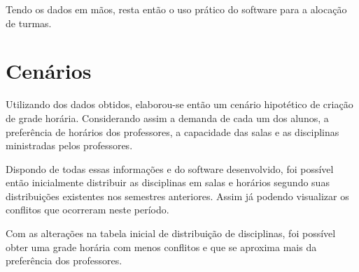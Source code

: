     Tendo os dados em mãos, resta então o uso prático do software para a alocação de turmas.

\section{Cenários} %

    Utilizando dos dados obtidos, elaborou-se então um cenário hipotético de criação de grade horária. Considerando assim a demanda de cada um dos alunos, a preferência de horários dos professores, a capacidade das salas e as disciplinas ministradas pelos professores.

    Dispondo de todas essas informações e do software desenvolvido, foi possível então inicialmente distribuir as disciplinas em salas e horários segundo suas distribuições existentes nos semestres anteriores. Assim já podendo visualizar os conflitos que ocorreram neste período.





    Com as alterações na tabela inicial de distribuição de disciplinas, foi possível obter uma grade horária com menos conflitos e que se aproxima mais da preferência dos professores.

